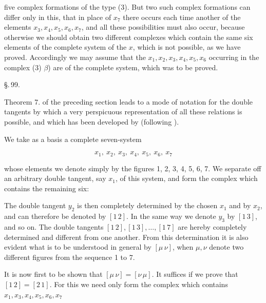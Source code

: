 five complex formations of the type (3). But two such complex formations can differ only in this, that in place of $x_7$ there occurs each time another of the elements $x_3, x_4, x_5, x_6, x_7$, and all these possibilities must also occur, because otherwise we should obtain two different complexes which contain the same six elements of the complete system of the $x$, which is not possible, as we have proved. Accordingly we may assume that the $x_1, x_2, x_3, x_4, x_5, x_6$ occurring in the complex (3) $\beta$) are  of the complete system, which was to be proved.

\S.\,99.


Theorem 7. of the preceding section leads to a mode of notation for the double tangents by which a very perspicuous representation of all these relations is possible, and which has been developed by  (following ).

We take as a basis a complete seven-system

\[ x_1,\ x_2,\ x_3,\ x_4,\ x_5,\ x_6,\ x_7 \]

whose elements we denote simply by the figures 1, 2, 3, 4, 5, 6, 7. We separate off an arbitrary double tangent, say $x_1$, of this system, and form the complex which contains the remaining six:


The double tangent $y_2$ is then completely determined by the chosen $x_1$ and by $x_2$, and can therefore be denoted by $[1\,2]$. In the same way we denote $y_3$ by $[1\,3]$, and so on. The double tangents $[1\,2], [1\,3], \dots, [1\,7]$ are hereby completely determined and different from one another. From this determination it is also evident what is to be understood in general by $[\mu\,\nu]$, when $\mu, \nu$ denote two different figures from the sequence 1 to 7.

It is now first to be shown that $[\mu\,\nu] = [\nu\,\mu]$. It suffices if we prove that $[1\,2] = [2\,1]$. For this we need only form the complex which contains $x_1, x_3, x_4, x_5, x_6, x_7$
